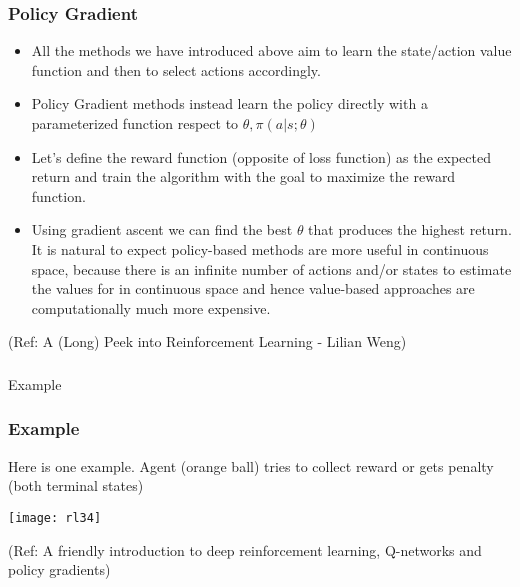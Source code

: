 \begin{frame}[fragile]\frametitle{Policy Gradient}

\begin{itemize}
\item All the methods we have introduced above aim to learn the state/action value function and then to
select actions accordingly. 
\item Policy Gradient methods instead learn the policy directly with a parameterized function respect to $\theta,\pi(a|s;\theta)$
\item Let’s define the reward function (opposite of loss
function) as the expected return and train the algorithm with the goal to maximize the reward function.
\item Using gradient ascent we can find the best $\theta$ that produces the highest return. It is natural to expect
policy-based methods are more useful in continuous space, because there is an infinite number of
actions and/or states to estimate the values for in continuous space and hence value-based
approaches are computationally much more expensive.
\end{itemize}




{\tiny (Ref: A (Long) Peek into Reinforcement Learning - Lilian Weng)}


\end{frame}

\begin{frame}[fragile]\frametitle{}
\begin{center}
{\Large Example}
\end{center}
\end{frame}



\begin{frame}[fragile]\frametitle{Example}

Here is one example. Agent (orange ball) tries to collect reward or gets penalty (both terminal states)

\begin{center}
\texttt{[image: rl34]}
\end{center}

{\tiny (Ref: A friendly introduction to deep reinforcement learning, Q-networks and policy gradients)}

\end{frame}


